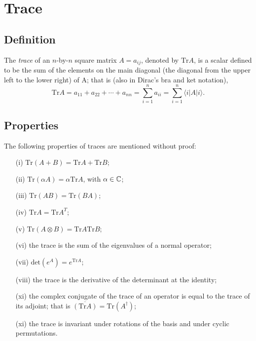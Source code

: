 \section{Trace}

\subsection{Definition}
The {\em trace} of an $n$-by-$n$ square matrix $A=a_{ij}$, denoted by
$\textrm{Tr} A$,  is a scalar
defined to be the sum of the elements on the main diagonal
 (the diagonal from the upper left to the lower right) of A; that is  (also in Dirac's bra and ket notation),
\begin{equation}
\textrm{Tr}A
= a_{11} +a_{22}+ \cdots +a_{nn}
=\sum_{i=1}^n a_{ii}=\sum_{i=1}^n \langle i \vert A\vert i \rangle.
\end{equation}

\subsection{Properties}

The following properties of traces are mentioned without proof:

\begin{itemize}
\item[(i)]
$\textrm{Tr}(A+B)=\textrm{Tr}A+\textrm{Tr}B$;
\item[(ii)]
$\textrm{Tr}(\alpha A)= \alpha \textrm{Tr}A$, with $\alpha \in {\Bbb C}$;
\item[(iii)]
$\textrm{Tr}(AB) = \textrm{Tr}(BA)$;
\item[(iv)]
$\textrm{Tr}A = \textrm{Tr}A^T$;
\item[(v)]
$\textrm{Tr}(A\otimes B)= \textrm{Tr}A \textrm{Tr}B$;
\item[(vi)]
the trace is the sum of the eigenvalues of a normal operator;
\item[(vii)]
$ \textrm{det}(e^A)=e^{\textrm{Tr}A} $;
\item[(viii)]
 the trace is the derivative of the determinant at the identity;
\item[(xi)]
the complex conjugate of the trace of an operator is equal to the trace of its adjoint; that is
$\overline{(  \textrm{Tr} A)}=\textrm{Tr} (A^\dagger)$;
\item[(xi)]
the trace is invariant under rotations of the basis and under cyclic permutations.
\end{itemize}


